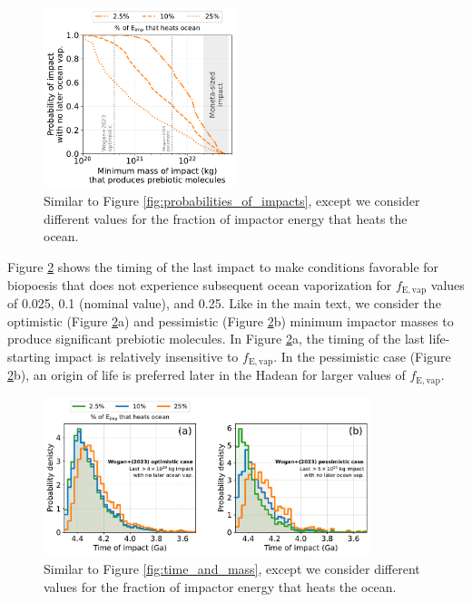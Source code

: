 \documentclass[preprint]{aastex63}
\begin{document}
\begin{figure}
  \centering
  \includegraphics[width=0.5\textwidth]{figures/probabilities_of_impacts_sens.pdf}
  \caption{Similar to Figure \ref{fig:probabilities_of_impacts}, except we consider different values for the fraction of impactor energy that heats the ocean.}
  \label{fig:probabilities_of_impacts_sens}
\end{figure}

Figure \ref{fig:timing_sensitivity} shows the timing of the last impact to make conditions favorable for biopoesis that does not experience subsequent ocean vaporization for $f_\mathrm{E,vap}$ values of 0.025, 0.1 (nominal value), and 0.25. Like in the main text, we consider the \citet{Wogan_2023} optimistic (Figure \ref{fig:timing_sensitivity}a) and pessimistic (Figure \ref{fig:timing_sensitivity}b) minimum impactor masses to produce significant prebiotic molecules. In Figure \ref{fig:timing_sensitivity}a, the timing of the last life-starting impact is relatively insensitive to $f_\mathrm{E,vap}$. In the \citet{Wogan_2023} pessimistic case (Figure \ref{fig:timing_sensitivity}b), an origin of life is preferred later in the Hadean for larger values of $f_\mathrm{E,vap}$.

\begin{figure}
  \centering
  \includegraphics[width=0.85\textwidth]{figures/timing_sensitivity.pdf}
  \caption{Similar to Figure \ref{fig:time_and_mass}, except we consider different values for the fraction of impactor energy that heats the ocean.}
  \label{fig:timing_sensitivity}
\end{figure}
\end{document}
